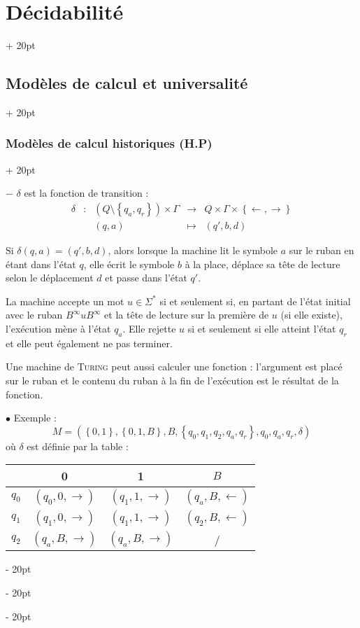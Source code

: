 \documentclass[a4paper, 12pt, twoside]{article}
\newcommand{\lr}[1]{\left( #1 \right)}
\newcommand{\set}[1]{\left\{ #1 \right\}}
\newcommand{\ind}[1][20pt]{\advance\leftskip + #1}
\newcommand{\deind}[1][20pt]{\advance\leftskip - #1}
\newenvironment{indt}[2][20pt]{#2 \par \ind[#1]}{\par \deind} %
\begin{document}
\begin{indt}{\section{Décidabilité}}
\begin{indt}{\subsection{Modèles de calcul et universalité}}
\begin{indt}{\subsubsection{Modèles de calcul historiques (H.P)}}
\begin{emphBox}
                    $-$ $\delta$ est la fonction de transition :
                    \[
                        \begin{array}{ccccc}
                            \delta
                            & : & \lr{Q \setminus \set{q_a, q_r}} \times \Gamma
                            & \longrightarrow & Q \times \Gamma \times \set{\leftarrow, \rightarrow}
                            \\
                            && (q, a)
                            & \longmapsto
                            & (q', b, d)
                        \end{array}
                    \]
                \end{emphBox}

                Si $\delta(q, a) = (q', b, d)$, alors lorsque la machine lit le symbole $a$ sur le ruban en étant dans l'état $q$, elle écrit le symbole $b$ à la place, déplace sa tête de lecture selon le déplacement $d$ et passe dans l'état $q'$.

                La machine accepte un mot $u \in \Sigma^*$ si et seulement si, en partant de l'état initial avec le ruban $B^\infty u B^\infty$ et la tête de lecture sur la première de $u$ (si elle existe), l'exécution mène à l'état $q_a$. Elle rejette $u$ si et seulement si elle atteint l'état $q_r$ et elle peut également ne pas terminer.

                \vspace{6pt}
                
                Une machine de \textsc{Turing} peut aussi calculer une fonction : l'argument est placé sur le ruban et le contenu du ruban à la fin de l'exécution est le résultat de la fonction.

                \vspace{12pt}
                
                $\bullet$ Exemple :
                \[
                    M = \lr{\set{0, 1}, \set{0, 1, B}, B, \set{q_0, q_1, q_2, q_a, q_r}, q_0, q_a, q_r, \delta}
                \]
                où $\delta$ est définie par la table :
                \begin{center}
                    \begin{tabular}{c|ccc}
                        & 0 & 1 & $B$
                        \\
                        \hline
                        $q_0$ & $(q_0, 0, \rightarrow)$ & $(q_1, 1, \rightarrow)$ & $(q_a, B, \leftarrow)$
                        \\
                        $q_1$ & $(q_1, 0, \rightarrow)$ & $(q_1, 1, \rightarrow)$ & $(q_2, B, \leftarrow)$
                        \\
                        $q_2$ & $(q_a, B, \rightarrow)$ & $(q_a, B, \rightarrow)$ & /
                    \end{tabular}
                \end{center}


\end{indt}
\end{indt}
\end{indt}
\end{document}
